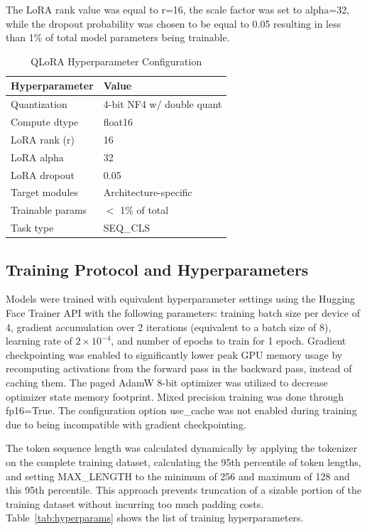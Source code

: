 \documentclass[journal]{IEEEtran}
\begin{document}
The LoRA rank value was equal to r=16, the scale factor was set to
alpha=32, while the dropout probability was chosen to be equal to 0.05
resulting in less than 1\% of total model parameters being trainable.

\begin{table}[htbp]
\caption{QLoRA Hyperparameter Configuration}
\label{tab:qlora}
\begin{center}
\begin{tabular}{ll}
\toprule
\textbf{Hyperparameter} & \textbf{Value} \\
\midrule
Quantization & 4-bit NF4 w/ double quant \\
Compute dtype & float16 \\
LoRA rank (r) & 16 \\
LoRA alpha & 32 \\
LoRA dropout & 0.05 \\
Target modules & Architecture-specific \\
Trainable params & $<$ 1\% of total \\
Task type & SEQ\_CLS \\
\bottomrule
\end{tabular}
\end{center}
\end{table}

\subsection{Training Protocol and Hyperparameters}

Models were trained with equivalent hyperparameter settings using the
Hugging Face Trainer API with the following parameters: training batch
size per device of 4, gradient accumulation over 2 iterations
(equivalent to a batch size of 8), learning rate of $2 \times 10^{-4}$, and number
of epochs to train for 1 epoch. Gradient checkpointing was enabled to
significantly lower peak GPU memory usage by recomputing activations
from the forward pass in the backward pass, instead of caching them. The
paged AdamW 8-bit optimizer was utilized to decrease optimizer state
memory footprint. Mixed precision training was done through fp16=True.
The configuration option use\_cache was not enabled during training due
to being incompatible with gradient checkpointing.

The token sequence length was calculated dynamically by applying the
tokenizer on the complete training dataset, calculating the 95th
percentile of token lengths, and setting MAX\_LENGTH to the minimum of
256 and maximum of 128 and this 95th percentile. This approach prevents
truncation of a sizable portion of the training dataset without
incurring too much padding costs. Table~\ref{tab:hyperparams} shows the list of training
hyperparameters.
\end{document}
